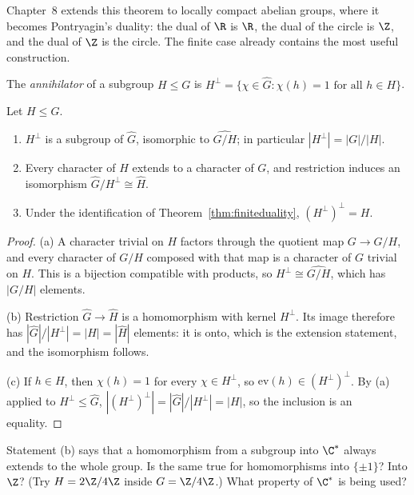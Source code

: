 Chapter~8 extends this theorem to locally compact abelian groups, where it becomes Pontryagin's duality: the dual of $\R$ is $\R$, the
dual of the circle is $\Z$, and the dual of $\Z$ is the circle. The finite case already contains the most useful construction.

\begin{definition}
The \emph{annihilator} of a subgroup $H\le G$ is $H^\perp=\{\chi\in\widehat G:\chi(h)=1\text{ for all }h\in H\}$.
\end{definition}

\begin{proposition}\label{prop:annihilator}
Let $H\le G$.
\begin{enumerate}
\item[(a)] $H^\perp$ is a subgroup of $\widehat G$, isomorphic to $\widehat{G/H}$; in particular $|H^\perp|=|G|/|H|$.
\item[(b)] Every character of $H$ extends to a character of $G$, and restriction induces an isomorphism $\widehat G/H^\perp\cong\widehat H$.
\item[(c)] Under the identification of Theorem~\ref{thm:finiteduality}, $(H^\perp)^\perp=H$.
\end{enumerate}
\end{proposition}
\begin{proof}
(a) A character trivial on $H$ factors through the quotient map $G\to G/H$, and every character of $G/H$ composed with that map is
a character of $G$ trivial on $H$. This is a bijection compatible with products, so $H^\perp\cong\widehat{G/H}$, which has $|G/H|$
elements.

(b) Restriction $\widehat G\to\widehat H$ is a homomorphism with kernel $H^\perp$. Its image therefore has $|\widehat G|/|H^\perp|=|H|=|\widehat H|$
elements: it is onto, which is the extension statement, and the isomorphism follows.

(c) If $h\in H$, then $\chi(h)=1$ for every $\chi\in H^\perp$, so $\mathrm{ev}(h)\in(H^\perp)^\perp$. By (a) applied to $H^\perp\le\widehat G$,
$|(H^\perp)^\perp|=|\widehat G|/|H^\perp|=|H|$, so the inclusion is an equality.
\end{proof}

\begin{think}
Statement (b) says that a homomorphism from a subgroup into $\C^*$ always extends to the whole group. Is the same true for
homomorphisms into $\{\pm1\}$? Into $\Z$? (Try $H=2\Z/4\Z$ inside $G=\Z/4\Z$.) What property of $\C^*$ is being used?
\end{think}

